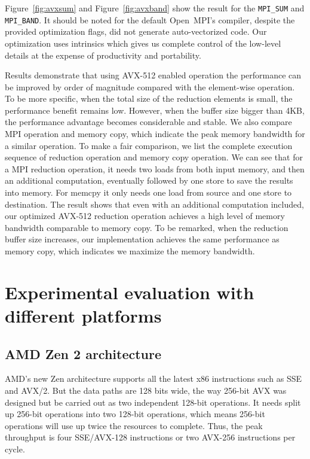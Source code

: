 \documentclass[5p,times,twocolumn]{elsarticle}
\newcommand{\mpifunc}[1]{\lstinline"MPI_#1"\xspace}
\newcommand{\ompi}[0]{Open~MPI\xspace}
\newcommand{\mpi}[0]{\textsc{MPI}\xspace}
\begin{document}
Figure~\ref{fig:avxsum} and Figure~\ref{fig:avxband} show the result for the
\mpifunc{SUM} and \mpifunc{BAND}.
It should be noted for the default \ompi's compiler, despite the
provided optimization flags, did not generate auto-vectorized
code. Our optimization uses intrinsics which gives us complete
control of the low-level details at the expense of productivity and
portability.

Results demonstrate that using AVX-512 enabled operation the
performance can be improved by order of magnitude compared with the
element-wise operation.  To be more specific, when the total size of
the reduction elements is small, the performance benefit remains low.
%
However, when the buffer size bigger than 4KB, the performance
advantage becomes considerable and stable.  We also compare MPI
operation and memory copy, which indicate the peak memory bandwidth
for a similar operation.  To make a fair comparison, we list the
complete execution sequence of reduction operation and memory copy
operation.  We can see that for a \mpi reduction operation, it needs
two loads from both input memory, and then an additional
computation, eventually followed by one store to save the results into
memory. For memcpy it only needs one load from source and one store to
destination.  The result shows that even with an additional
computation included, our optimized AVX-512 reduction operation
achieves a high level of memory bandwidth comparable to
memory copy.  To be remarked, when the reduction buffer size increases,
our implementation achieves the same performance as
memory copy, which indicates we maximize the memory bandwidth.

\section{Experimental evaluation with different platforms}\label{sec:platformsexperiments}
\subsection{AMD Zen 2 architecture}
AMD's new Zen architecture supports all the latest x86 instructions such as SSE and AVX/2.
But the data paths are 128 bits wide, the way 256-bit AVX was designed but be carried
out as two independent 128-bit operations.
It needs split up 256-bit operations into two 128-bit operations, which means 256-bit operations will
use up twice the resources to complete. Thus, the peak throughput is four SSE/AVX-128 instructions or two AVX-256 instructions per cycle.
\end{document}
